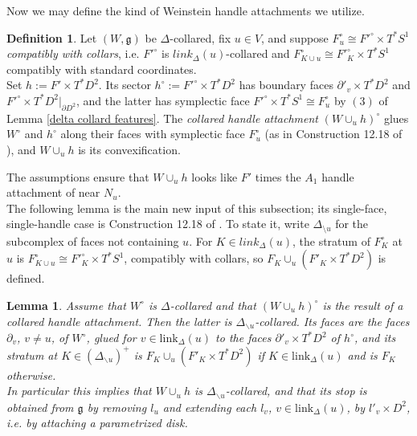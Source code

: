 \documentclass[11pt]{amsart}
\newtheorem{lem}[thm]{Lemma}
\theoremstyle{definition}
\newtheorem{defn}[thm]{Definition}
\theoremstyle{remark}
\numberwithin{equation}{section}
\begin{document}
Now we may define the kind of Weinstein handle attachments we utilize.

\begin{defn}\label{collared handles}
Let $(W,\mathfrak g)$ be $\Delta$-collared, fix $u\in V$, and suppose $F^\circ_u\cong F'^\circ\times T^*S^1$ \textit{compatibly with collars}, i.e. $F'^\circ$ is $link_\Delta(u)$-collared and $F^\circ_{K\cup u}\cong F'^\circ_K\times T^*S^1$ compatibly with standard coordinates.\\

Set $h:=F'\times T^*D^2$. Its sector $h^\circ:=F'^\circ\times T^*D^2$ has boundary faces $\partial'_v\times T^*D^2$ and $F'^\circ\times T^*D^2|_{\partial D^2}$, and the latter has symplectic face $F'^\circ\times T^*S^1\cong F_u^\circ$ by $(3)$ of Lemma \ref{delta collard features}. The \textit{collared handle attachment} $(W\cup_uh)^\circ$ glues $W^\circ$ and $h^\circ$ along their faces with symplectic face $F^\circ_u$ (as in Construction 12.18 of \cite{GPSI}), and $W\cup_uh$ is its convexification.
\end{defn}

The assumptions ensure that $W\cup_uh$ looks like $F'$ times the $A_1$ handle attachment of \cite{GL} near $N_u$.\\

The following lemma is the main new input of this subsection; its single-face, single-handle case is Construction 12.18 of \cite{GPSI}. To state it, write $\Delta_{\setminus u}$ for the subcomplex of faces not containing $u$. For $K \in link_\Delta(u)$, the stratum of $F^\circ_K$ at $u$ is $F^\circ_{K\cup u}\cong F'^\circ_K\times T^*S^1$, compatibly with collars, so $F_K\cup_u(F'_K\times T^*D^2)$ is defined.
 
\begin{lem}\label{handle ends}
Assume that $W^\circ$ is $\Delta$-collared and that $(W\cup_uh)^\circ$ is the result of a collared handle attachment. Then the latter is $\Delta_{\backslash u}$-collared. Its faces are the faces $\partial_v$, $v\ne u$, of $W^\circ$, glued for $v\in\mathrm{link}_\Delta(u)$ to the faces $\partial'_v\times T^*D^2$ of $h^\circ$, and its stratum at $K\in(\Delta_{\backslash u})^+$ is $F_K\cup_u(F'_K\times T^*D^2)$ if $K\in\mathrm{link}_\Delta(u)$ and is $F_K$ otherwise.\\

In particular this implies that $W\cup_uh$ is $\Delta_{\backslash u}$-collared, and that its stop is obtained from $\mathfrak g$ by removing $l_u$ and extending each $l_v$, $v\in\mathrm{link}_\Delta(u)$, by $l'_v\times D^2$, i.e. by attaching a parametrized disk.
\end{lem}
 
\end{document}
